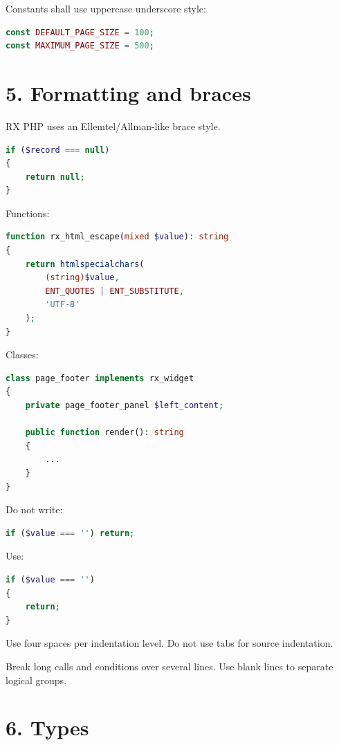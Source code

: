 \documentclass[11pt,a4paper]{article}
\begin{document}
Constants shall use uppercase underscore style:

\begin{lstlisting}[language=PHP]
const DEFAULT_PAGE_SIZE = 100;
const MAXIMUM_PAGE_SIZE = 500;
\end{lstlisting}

\section{5. Formatting and braces}\label{5-formatting-and-braces}

RX PHP uses an Ellemtel/Allman-like brace style.

\begin{lstlisting}[language=PHP]
if ($record === null)
{
    return null;
}
\end{lstlisting}

Functions:

\begin{lstlisting}[language=PHP]
function rx_html_escape(mixed $value): string
{
    return htmlspecialchars(
        (string)$value,
        ENT_QUOTES | ENT_SUBSTITUTE,
        'UTF-8'
    );
}
\end{lstlisting}

Classes:

\begin{lstlisting}[language=PHP]
class page_footer implements rx_widget
{
    private page_footer_panel $left_content;

    public function render(): string
    {
        ...
    }
}
\end{lstlisting}

Do not write:

\begin{lstlisting}[language=PHP]
if ($value === '') return;
\end{lstlisting}

Use:

\begin{lstlisting}[language=PHP]
if ($value === '')
{
    return;
}
\end{lstlisting}

Use four spaces per indentation level. Do not use tabs for source
indentation.

Break long calls and conditions over several lines. Use blank lines to
separate logical groups.

\section{6. Types}\label{6-types}
\end{document}
